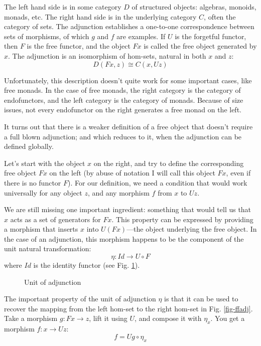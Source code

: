 \documentclass[letterpaper, 10 pt, conference]{ieeeconf}
\begin{document}
The left hand side is in some category $D$ of structured objects: algebras, monoids, monads, etc. The right hand side is in the underlying category $C$, often the category of sets. The adjunction establishes a one-to-one correspondence between sets of morphisms, of which $g$ and $f$ are examples. If $U$ is the forgetful functor, then $F$ is the free functor, and the object $F x$ is called the free object generated by $x$. The adjunction is an isomorphism of hom-sets, natural in both $x$ and $z$:
\[D(F x, z) \cong C(x, U z)\]

Unfortunately, this description doesn't quite work for some important cases, like free monads. In the case of free monads, the right category is the category of endofunctors, and the left category is the category of monads. Because of size issues, not every endofunctor on the right generates a free monad on the left. 

It turns out that there is a weaker definition of a free object that doesn't require a full blown adjunction; and which reduces to it, when the adjunction can be defined globally. 

Let's start with the object $x$ on the right, and try to define the corresponding free object $F x$ on the left (by abuse of notation I will call this object $F x$, even if there is no functor $F$). For our definition, we need a condition that would work universally for any object $z$, and any morphism $f$ from $x$ to $U z$. 

We are still missing one important ingredient: something that would tell us that $x$ acts as a set of generators for $F x$. This property can be expressed by providing a morphism that inserts $x$ into $U (F x)$---the object underlying the free object. In the case of an adjunction, this morphism happens to be the component of the unit natural transformation: 
\[\eta \colon Id \to U \circ F\]
where $Id$ is the identity functor (see Fig. \ref{fig-uadj}).

\begin{figure}[h]
\centering
{}
\caption{Unit of adjunction}
\label{fig-uadj}
\end{figure}

The important property of the unit of adjunction $\eta$ is that it can be used to recover the mapping from the left hom-set to the right hom-set in Fig. \ref{fig-ffadj}. Take a morphism $g \colon F x \to z$, lift it using $U$, and compose it with $\eta_x$. You get a morphism $f \colon x \to U z$:
\[ f = U g \circ \eta_x \]
\end{document}

